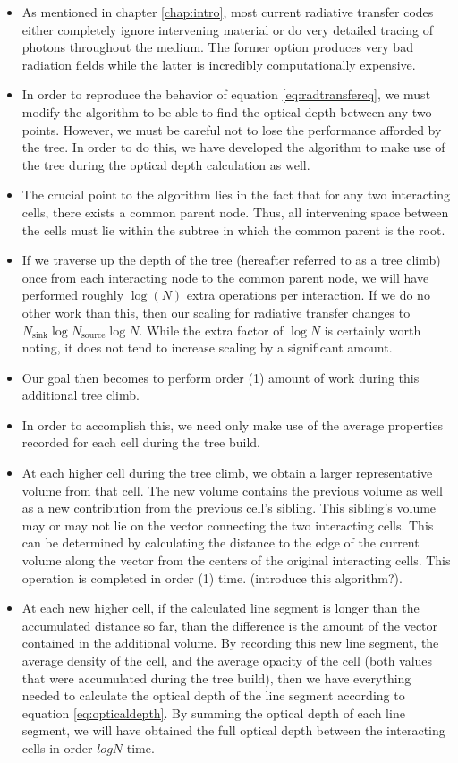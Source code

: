 \begin{itemize}
\item As mentioned in chapter \ref{chap:intro}, most current radiative transfer codes either completely ignore intervening material or do very detailed tracing of photons throughout the medium. The former option produces very bad radiation fields while the latter is incredibly computationally expensive.
\item In order to reproduce the behavior of equation \ref{eq:radtransfereq}, we must modify the algorithm to be able to find the optical depth between any two points. However, we must be careful not to lose the performance afforded by the tree. In order to do this, we have developed the algorithm to make use of the tree during the optical depth calculation as well.
\item The crucial point to the algorithm lies in the fact that for any two interacting cells, there exists a common parent node. Thus, all intervening space between the cells must lie within the subtree in which the common parent is the root.
\item If we traverse up the depth of the tree (hereafter referred to as a tree climb) once from each interacting node to the common parent node, we will have performed roughly $\log(N)$ extra operations per interaction. If we do no other work than this, then our scaling for radiative transfer changes to $N_{\mbox{sink}}\log{N_{\mbox{source}}}\log{N}$. While the extra factor of $\log{N}$ is certainly worth noting, it does not tend to increase scaling by a significant amount.
\item Our goal then becomes to perform order (1) amount of work during this additional tree climb.
\item In order to accomplish this, we need only make use of the average properties recorded for each cell during the tree build.
\item At each higher cell during the tree climb, we obtain a larger representative volume from that cell. The new volume contains the previous volume as well as a new contribution from the previous cell's sibling. This sibling's volume may or may not lie on the vector connecting the two interacting cells. This can be determined by calculating the distance to the edge of the current volume along the vector from the centers of the original interacting cells. This operation is completed in order (1) time. (introduce this algorithm?).
\item At each new higher cell, if the calculated line segment is longer than the accumulated distance so far, than the difference is the amount of the vector contained in the additional volume. By recording this new line segment, the average density of the cell, and the average opacity of the cell (both values that were accumulated during the tree build), then we have everything needed to calculate the optical depth of the line segment according to equation \ref{eq:opticaldepth}. By summing the optical depth of each line segment, we will have obtained the full optical depth between the interacting cells in order $log{N}$ time.
\end{itemize}

